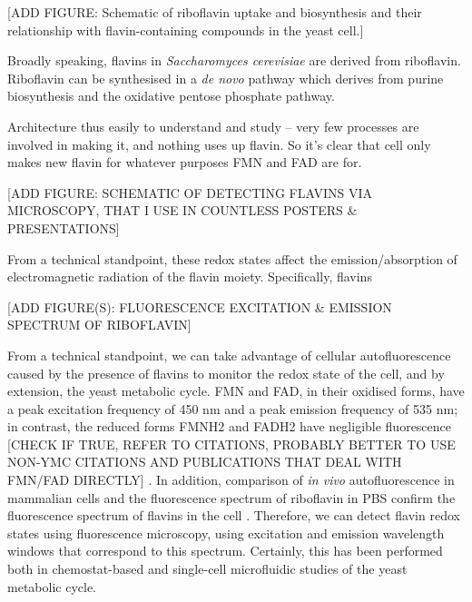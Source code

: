[ADD FIGURE: Schematic of riboflavin uptake and biosynthesis and their relationship with flavin-containing compounds in the yeast cell.]

Broadly speaking, flavins in \emph{Saccharomyces cerevisiae} are derived from riboflavin.
Riboflavin can be synthesised in a \emph{de novo} pathway which derives from purine biosynthesis and the oxidative pentose phosphate pathway.

Architecture thus easily to understand and study -- very few processes are involved in making it, and nothing uses up flavin.
So it's clear that cell only makes new flavin for whatever purposes FMN and FAD are for.

[ADD FIGURE: SCHEMATIC OF DETECTING FLAVINS VIA MICROSCOPY, THAT I USE IN COUNTLESS POSTERS \& PRESENTATIONS]

From a technical standpoint, these redox states affect the emission/absorption of electromagnetic radiation of the flavin moiety.
Specifically, flavins

[ADD FIGURE(S): FLUORESCENCE EXCITATION \& EMISSION SPECTRUM OF RIBOFLAVIN]

From a technical standpoint, we can take advantage of cellular autofluorescence caused by the presence of flavins to monitor the redox state of the cell, and by extension, the yeast metabolic cycle.
FMN and FAD, in their oxidised forms, have a peak excitation frequency of 450 nm and a peak emission frequency of 535 nm;
in contrast, the reduced forms FMNH2 and FADH2 have negligible fluorescence [CHECK IF TRUE, REFER TO CITATIONS, PROBABLY BETTER TO USE NON-YMC CITATIONS AND PUBLICATIONS THAT DEAL WITH FMN/FAD DIRECTLY] \parencite{baumgartnerFlavinbasedMetabolicCycles2018, sasidharanTimeStructureYeastMetabolism2012}.
In addition, comparison of \emph{in vivo} autofluorescence in mammalian cells and the fluorescence spectrum of riboflavin in PBS confirm the fluorescence spectrum of flavins in the cell \parencite{aubinAutofluorescenceViableCultured1979}.
Therefore, we can detect flavin redox states using fluorescence microscopy, using excitation and emission wavelength windows that correspond to this spectrum.
Certainly, this has been performed both in chemostat-based \parencite{sasidharanTimeStructureYeastMetabolism2012, murrayRedoxRegulationRespiring2011} and single-cell microfluidic studies \parencite{baumgartnerFlavinbasedMetabolicCycles2018} of the yeast metabolic cycle.

